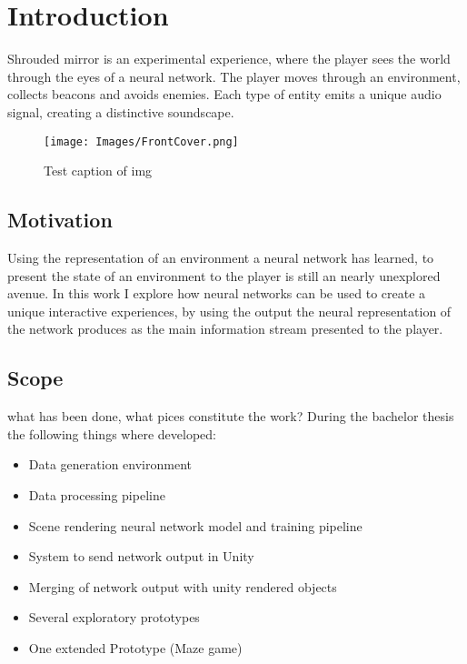 \chapter{Introduction}
Shrouded mirror is an experimental experience, where the player sees the world through the eyes of a neural network. The player moves through an environment, collects beacons and avoids enemies. Each type of entity emits a unique audio signal, creating a distinctive soundscape.
\begin{figure}[hbt]
\centering
 {\caption{Test caption of img}
    }
{\texttt{[image: Images/FrontCover.png]}}
\end{figure}

\section{Motivation}
Using the representation of an environment a neural network has learned, to present the state of an environment to the player is still an nearly unexplored avenue. 
In this work I explore how neural networks can be used to create a unique interactive experiences, by using the output the neural representation of the network produces as the main information stream presented to the player.

\section{Scope}
what has been done, what pices constitute the work?
During the bachelor thesis the following things where developed:

\begin{itemize}
\item{Data generation environment}
\item{Data processing pipeline}
\item{Scene rendering neural network model and training pipeline}
\item{System to send network output in Unity}
\item{Merging of network output with unity rendered objects}
\item{Several exploratory prototypes}
\item{One extended Prototype (Maze game)}
\end{itemize}